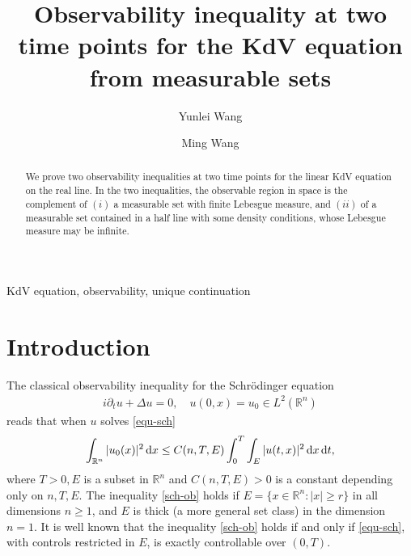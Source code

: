 \documentclass[preprint,12pt]{elsarticle}
\def\R {\mathbb{R}}
\def\d{{\,\rm d}}
\begin{document}
\begin{frontmatter}

\title{Observability inequality at two time points for the KdV equation  from measurable sets}


\author[]{Yunlei Wang}

\author[]{Ming Wang}







\address{School of Mathematics and Physics, China University of Geosciences\\ Wuhan, Hubei, 430074, P.R. China}



\begin{abstract}

We prove two observability inequalities at two time points for the linear KdV equation on the real line. In the two inequalities, the observable region in space is the complement of $(i)$ a measurable set with finite Lebesgue measure, and $(ii)$ of a measurable set contained in a half line with some density conditions, whose Lebesgue measure may be infinite.

\end{abstract}



\begin{keyword}
KdV equation, observability,  unique continuation
\end{keyword}


\end{frontmatter}



\section{Introduction}

The classical observability inequality for the Schr\"{o}dinger equation
\begin{align}\label{equ-sch}
i\partial_t u+\Delta u=0, \quad u(0,x)=u_0\in L^2(\R^n)
\end{align}
reads that when $u$ solves \eqref{equ-sch}
\begin{align}\label{sch-ob}
\int_{\R^n}|u_0(x)|^2\d x\leq C(n,T,E)\int_0^T\int_E|u(t,x)|^2\d x \d t,
\end{align}
where $T>0, E$ is a subset in $\R^n$ and $C(n,T,E)>0$ is a constant depending only on $n,T,E$. The inequality \eqref{sch-ob} holds if $E=\{x\in \R^n: |x|\geq r\}$ \cite{Rosier} in all dimensions $n\geq 1$, and $E$ is thick \cite{HWW} (a more general set class) in the dimension $n=1$. It is well known that the inequality \eqref{sch-ob} holds if and only if \eqref{equ-sch}, with controls restricted in $E$, is exactly controllable over $(0,T)$.
\end{document}
